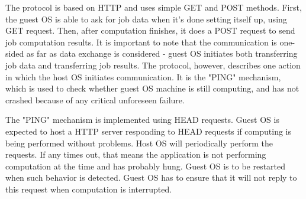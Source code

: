 The protocol is based on HTTP and uses simple GET and POST methods. First, the guest OS is able to ask for job data when it's done setting itself up, using GET request. Then, after computation finishes, it does a POST request to send job computation results. It is important to note that the communication is one-sided as far as data exchange is considered - guest OS initiates both transferring job data and transferring job results. The protocol, however, describes one action in which the host OS initiates communication. It is the "PING" mechanism, which is used to check whether guest OS machine is still computing, and has not crashed because of any critical unforeseen failure. 

The "PING" mechanism is implemented using HEAD requests. Guest OS is expected to host a HTTP server responding to HEAD requests if computing is being performed without problems. Host OS will periodically perform the requests. If any times out, that means the application is not performing computation at the time and has probably hung. Guest OS is to be restarted when such behavior is detected. Guest OS has to ensure that it will not reply to this request when computation is interrupted.
